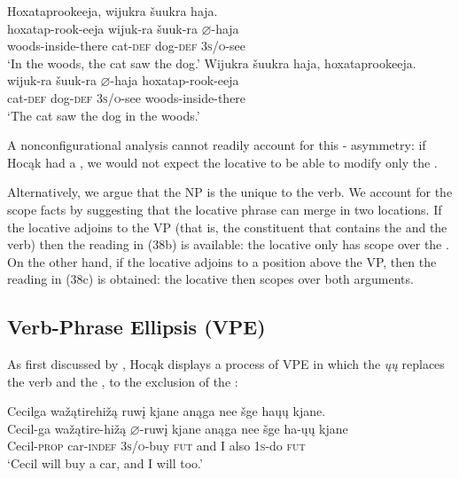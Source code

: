 \documentclass[output=paper]{LSP/langsci}
\begin{document}
\begin{exe}
\ex\label{ex:jrs:39}
\begin{xlist}
\ex 
\glll Hoxataprookeeja, 		wijukra	\v{s}uukra			haja.\\
hoxatap-rook-eeja		wijuk-ra	\v{s}uuk-ra		$\varnothing$-haja \\
	woods-inside-there 	cat-\textsc{def}		dog-\textsc{def}		\textsc{3s/o}-see \\
\trans `In the woods, the cat saw the dog.'
\ex 
\glll Wijukra	\v{s}uukra			haja,				hoxataprookeeja.\\
wijuk-ra	\v{s}uuk-ra		$\varnothing$-haja			hoxatap-rook-eeja \\
	cat-\textsc{def}		dog-\textsc{def}		\textsc{3s/o}-see	woods-inside-there \\
\trans `The cat saw the dog in the woods.'
\end{xlist}
\end{exe}
	
A nonconfigurational analysis cannot readily account for this - asymmetry: if Hocąk had a , we would not expect the locative to be able to modify only the .
	
Alternatively, we argue that the  NP is the unique  to the verb. We account for the scope facts by suggesting that the locative phrase can merge in two locations. If the locative adjoins to the VP (that is, the constituent that contains the  and the verb) then the reading in (38b) is available: the locative only has scope over the . On the other hand, if the locative adjoins to a position above the VP, then the reading in (38c) is obtained: the locative then scopes over both arguments.

\subsection{Verb-Phrase Ellipsis (VPE)}

As first discussed by \citet{Johnson2013}, Hocąk displays a process of VPE in which the  \textit{\k{u}\k{u}} replaces the verb and the , to the exclusion of the  :

\begin{exe}
\ex\label{ex:jrs:40} 
\glll Cecilga	wa\v{z}ątirehi\v{z}ą		ruw\k{i}	kjane		anąga	nee		\v{s}ge		ha\k{u}\k{u}			kjane.\\
Cecil-ga	wa\v{z}ątire-hi\v{z}ą	$\varnothing$-ruw\k{i}		kjane		anąga	nee	\v{s}ge ha-\k{u}\k{u}		kjane \\
Cecil-\textsc{prop}		car-\textsc{indef}			\textsc{3s/o}-buy		\textsc{fut}	and	I	also	\textsc{1s}-do	\textsc{fut} \\
\trans `Cecil will buy a car, and I will too.'
\end{exe}
\end{document}
